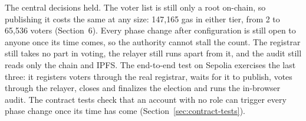 The central decisions held. The voter list is still only a root on-chain, so
publishing it costs the same at any size: 147,165 gas in either tier, from 2
to 65,536 voters (Section~6). Every phase change after
configuration is still open to anyone once its time comes, so the authority
cannot stall the count. The registrar still takes no part in voting, the
relayer still runs apart from it, and the audit still reads only the chain and
IPFS. The end-to-end test on Sepolia exercises the last three: it registers
voters through the real registrar, waits for it to publish, votes through the
relayer, closes and finalizes the election and runs the in-browser audit. The
contract tests check that an account with no role can trigger every phase
change once its time has come (Section~\ref{sec:contract-tests}).
